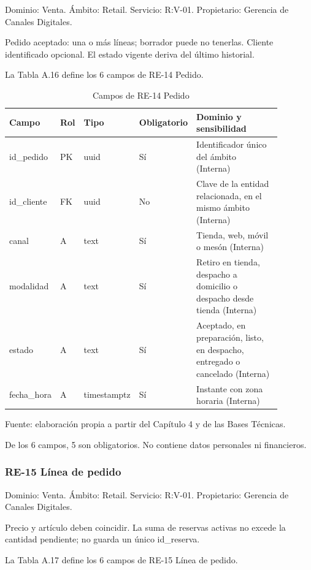 \documentclass[11pt]{article}
\begin{document}
Dominio: Venta. Ámbito: Retail. Servicio: R:V-01. Propietario: Gerencia de Canales Digitales.

Pedido aceptado: una o más líneas; borrador puede no tenerlas. Cliente identificado opcional. El estado vigente deriva del último historial.

La Tabla A.16 define los 6 campos de RE-14 Pedido.

\begin{table}[htbp]
\caption{Campos de RE-14 Pedido}\label{tab:d_re14}
\centering
\begin{tabular}{@{}p{0.167\linewidth}p{0.070\linewidth}p{0.079\linewidth}p{0.097\linewidth}p{0.465\linewidth}@{}}
\toprule Campo & Rol & Tipo & Obligatorio & Dominio y sensibilidad \\
\midrule
id\_pedido & PK & uuid & Sí & Identificador único del ámbito (Interna) \\
id\_cliente & FK & uuid & No & Clave de la entidad relacionada, en el mismo ámbito (Interna) \\
canal & A & text & Sí & Tienda, web, móvil o mesón (Interna) \\
modalidad & A & text & Sí & Retiro en tienda, despacho a domicilio o despacho desde tienda (Interna) \\
estado & A & text & Sí & Aceptado, en preparación, listo, en despacho, entregado o cancelado (Interna) \\
fecha\_hora & A & timestamptz & Sí & Instante con zona horaria (Interna) \\
\bottomrule
\end{tabular}
\par\smallskip
{\raggedright Fuente: elaboración propia a partir del Capítulo 4 y de las Bases Técnicas.\par}
\end{table}


De los 6 campos, 5 son obligatorios. No contiene datos personales ni financieros.

\subsubsection{RE-15 Línea de pedido}

Dominio: Venta. Ámbito: Retail. Servicio: R:V-01. Propietario: Gerencia de Canales Digitales.

Precio y artículo deben coincidir. La suma de reservas activas no excede la cantidad pendiente; no guarda un único id\_reserva.

La Tabla A.17 define los 6 campos de RE-15 Línea de pedido.
\end{document}
